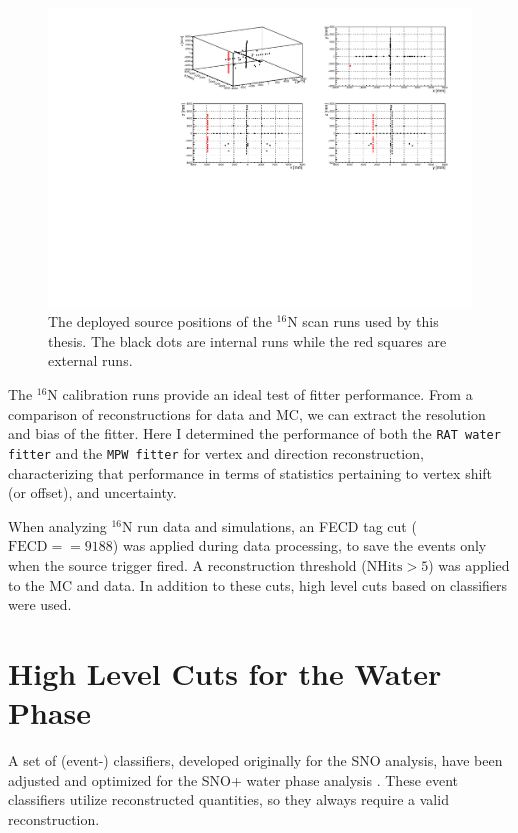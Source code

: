 \begin{figure}[!htb]
	\centering
	\includegraphics[width=15cm]{N16_3Dscan.pdf}
	\caption[The deployed source positions of the $^{16}$N scan runs.]{The deployed source positions of the $^{16}$N scan runs used by this thesis. The black dots are internal runs while the red squares are external runs.	\label{N16_3Dscan}}
\end{figure}

The $^{16}$N calibration runs provide an ideal test of fitter performance. From a comparison of reconstructions for data and MC, we can extract the resolution and bias of the fitter. Here I determined the performance of both the \texttt{RAT water fitter} and the \texttt{MPW fitter} for vertex and direction reconstruction, characterizing that performance in terms of statistics pertaining to vertex shift (or offset), and uncertainty. 

When analyzing $^{16}$N run data and simulations, an FECD tag cut ($\mathrm{FECD}==9188$) was applied during data processing, to save the events only when the source trigger fired. A reconstruction threshold ($\mathrm{NHits}>5$) was applied to the MC and data. In addition to these cuts, high level cuts based on classifiers were used. 

\section{High Level Cuts for the Water Phase}\label{sect:high_level_cuts}

A set of (event-) classifiers, developed originally for the SNO analysis, have been adjusted and optimized for the SNO+ water phase analysis \cite{highlevel}. These event classifiers utilize reconstructed quantities, so they always require a valid reconstruction.

